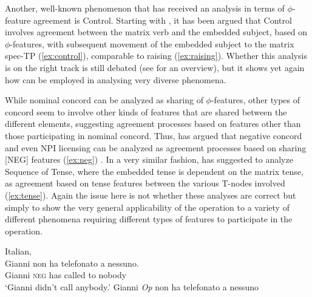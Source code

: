 \documentclass[output=paper
,modfonts
,nonflat]{langsci/langscibook}
\begin{document}
\noindent Another, well-known phenomenon that has received an analysis in terms of $\phi$-feature agreement is Control. Starting with \citet{hornstein1999}, it has been argued that Control involves agreement between the matrix verb and the embedded subject, based on $\phi$-features, with subsequent movement of the embedded subject to the matrix spec-TP (\ref{ex:control}), comparable to raising (\ref{ex:raising}). Whether this analysis is on the right track is still debated (see \citealt{landau2013} for an overview), but it shows yet again how {\agr} can be employed in analysing very diverse phenomena.
\begin{exe}
	\ex \label{ex:binding}
	\begin{xlist}
	\end{xlist}
	\ex
	\begin{xlist}
		 \label{ex:raising}
		 \label{ex:control}
	\end{xlist}
\end{exe}
While nominal concord can be analyzed as sharing of $ \phi $-features, other types of concord seem to involve other kinds of features that are shared between the different elements, suggesting agreement processes based on features other than those participating in nominal concord. Thus, \citet{zeijlstra2004} has argued that negative concord and even NPI licensing can be analyzed as agreement processes based on sharing [NEG] features (\ref{ex:neg}) \citep{haegemanzanuttini1991}. In a very similar fashion, \citet{Zeijlstra2012} has suggested to analyze Sequence of Tense, where the embedded tense is dependent on the matrix tense, as agreement based on tense features between the various T-nodes involved (\ref{ex:tense}).
Again the issue here is not whether these analyses are correct but simply to show the very general applicability of the operation {\agr} to a variety of different phenomena requiring different types of features to participate in the operation.
\begin{exe}
	\ex \label{ex:neg}
	\begin{xlist}
		\ex	 Italian, \citep{zeijlstra2004}\\
		\gll Gianni non ha telefonato a nessuno.\\
		Gianni \textsc{neg} has called to nobody\\
		\glt `Gianni didn’t call anybody.'
		\ex Gianni \textit{Op} non ha telefonato a  nessuno\sub{[\textsc{neg}]}
	\end{xlist}
\end{exe}
\end{document}
